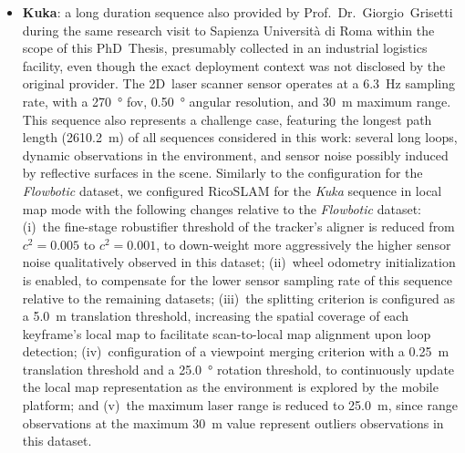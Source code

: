 \begin{itemize}
\item \textbf{Kuka}: a long duration sequence also provided by
      Prof.~Dr.~Giorgio~Grisetti during the same research visit to
      Sapienza Università di Roma within the scope of this PhD~Thesis,
      presumably collected in an industrial logistics facility, even though
      the exact deployment context was not disclosed by the original provider.
      The 2D~laser scanner sensor operates at a \SI{6.3}{\hertz} sampling rate,
      with a \SI{270}{\degree} \gls{fov}, \SI{0.50}{\degree} angular
      resolution, and \SI{30}{\metre} maximum range.
      This sequence also represents a challenge case, featuring the longest path
      length (\SI{2610.2}{\metre}) of all sequences considered in this work:
      several long loops, dynamic observations in the environment, and sensor
      noise possibly induced by reflective surfaces in the scene.
      Similarly to the configuration for the \emph{Flowbotic} dataset,
      we configured RicoSLAM for the \emph{Kuka} sequence in local map mode with
      the following changes relative to the \emph{Flowbotic} dataset:
      (i)~the fine-stage robustifier threshold of the tracker's aligner
      is reduced from $c^2 = 0.005$ to $c^2 = 0.001$, to down-weight more
      aggressively the higher sensor noise qualitatively observed in
      this dataset;
      (ii)~wheel odometry initialization is enabled, to compensate for the lower
      sensor sampling rate of this sequence relative to the remaining datasets;
      (iii)~the splitting criterion is configured as a \SI{5.0}{\metre}
      translation threshold, increasing the spatial coverage of each keyframe's
      local map to facilitate scan-to-local map alignment upon loop detection;
      (iv)~configuration of a viewpoint merging criterion with a
      \SI{0.25}{\metre} translation threshold and a \SI{25.0}{\degree} rotation
      threshold, to continuously update the local map representation
      as the environment is explored by the mobile platform; and
      (v)~the maximum laser range is reduced to \SI{25.0}{\metre}, since range
      observations at the maximum \SI{30}{\metre} value represent outliers
      observations in this dataset.
\end{itemize}



